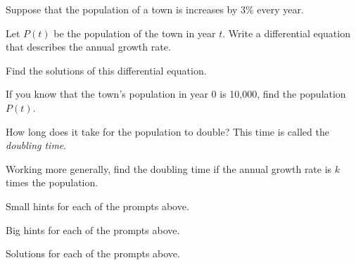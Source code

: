 \begin{activity} \label{A:7.4.1}  
Suppose that the population of a town is increases by 3\% every year.

\ba
\item Let $P(t)$ be the population of the town in year $t$.  Write a
  differential equation that describes the annual growth rate.

\item Find the solutions of this differential equation.

\item If you know that the town's population in year 0 is 10,000, find
  the population $P(t)$.

\item How long does it take for the population to double?  This time
  is called the {\em doubling time}.

\item Working more generally, find the doubling time if the annual
  growth rate is $k$ times the population.

\ea
\end{activity}
\begin{smallhint}
\ba
	\item Small hints for each of the prompts above.
\ea
\end{smallhint}
\begin{bighint}
\ba
	\item Big hints for each of the prompts above.
\ea
\end{bighint}
\begin{activitySolution}
\ba
	\item Solutions for each of the prompts above.
\ea
\end{activitySolution}
\aftera
